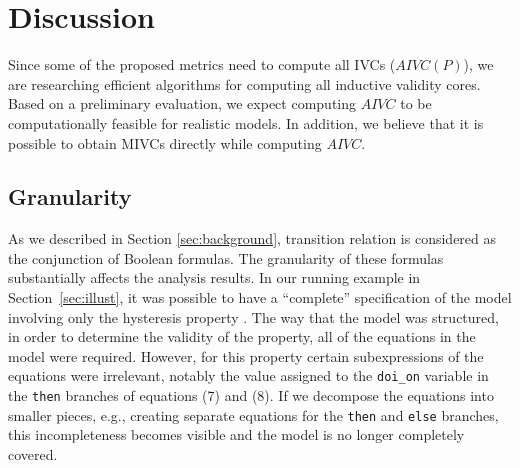\section{Discussion}
\label{sec:discussion}
\iffalse As mentioned, IVCs are derived from inductive invariants; in other words, they are built upon the proof of the validity of a given property. One interesting fact about proofs
  is that a given property could be proved from different proof paths.
  The $AIVC$ captures this fact and gives a clear picture of various ways a property is satisfied. By getting all the MIVCs for the system properties and categorizing them, one can find if there are design artifacts that do not trace to any property: set $\bigcap \{IRR (P) | P \in \Delta \}$.  If this set is non-empty, it is a possible indication of ``gold plating" or missing properties \cite{Murugesan16:renext}.
\fi

Since some of the proposed metrics need to compute all IVCs ($AIVC(P)$),
we are researching efficient algorithms for computing all inductive validity cores.
Based on a preliminary evaluation, we expect computing $AIVC$ to be computationally feasible for realistic models. In addition, we believe that it is possible to obtain MIVCs directly while computing $AIVC$.

\subsection{Granularity}

As we described in Section \ref{sec:background}, transition relation is considered
as the conjunction of Boolean formulas. The granularity of these formulas substantially affects the analysis results.  In our running example in Section~\ref{sec:illust}, it was possible to have a ``complete'' specification of the model involving only the hysteresis property \hystp.  The way that the model was structured, in order to determine the validity of the property, all of the equations in the model were required.  However, for this property certain subexpressions of the equations were irrelevant, notably the value assigned to the \texttt{doi\_on} variable in the \texttt{then} branches of equations (7) and (8).  If we decompose the equations into smaller pieces, e.g., creating separate equations for the \texttt{then} and \texttt{else} branches, this incompleteness becomes visible and the model is no longer completely covered.

